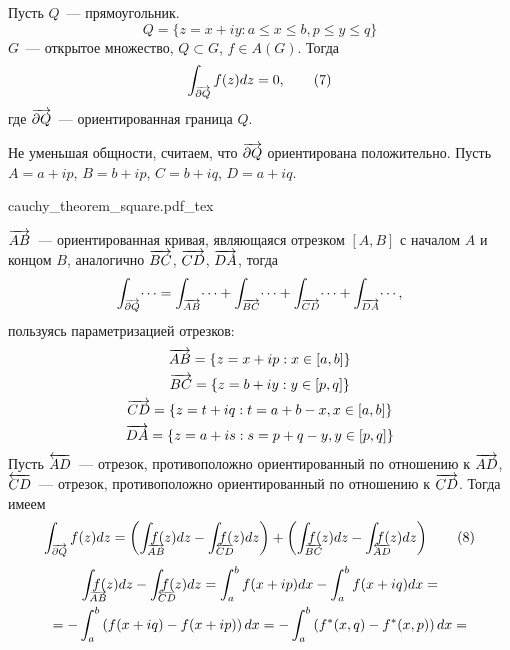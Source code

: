\documentclass[main]{subfiles}
\begin{document}
\begin{theorem}\label{2:cauchy_square}
    Пусть $Q$~--- прямоугольник.
    \[Q = \{z = x + iy: a \le x \le b, p \le y \le q\}\]
    $G$~--- открытое множество, $Q \subset G$, $f \in A(G)$.
    Тогда
    \[\AnClOrInt[\AnClOrCurve[\partial Q]] f(z) dz = 0, \tag{7}\]
    где $\AnClOrCurve[\partial Q]$~--- ориентированная граница $Q$.
\end{theorem}
\begin{longProof}
    Не уменьшая общности, считаем, что $\AnClOrCurve[\partial Q]$ ориентирована положительно.
    Пусть $A = a + ip$, $B = b + ip$, $C = b + iq$, $D = a + iq$.
    \begin{center}
        {cauchy_theorem_square.pdf_tex}
    \end{center}
    $\AnClOrCurve[AB]$~--- ориентированная кривая, являющаяся отрезком $[A, B]$ с началом $A$ и концом $B$, аналогично $\AnClOrCurve[BC]$, $\AnClOrCurve[CD]$, $\AnClOrCurve[DA]$, тогда
    \[\AnClOrInt[\AnClOrCurve[\partial Q]] \dotsi = \AnClOrInt[\AnClOrCurve[AB]] \dotsi + \AnClOrInt[\AnClOrCurve[BC]] \dotsi + \AnClOrInt[\AnClOrCurve[CD]] \dotsi + \AnClOrInt[\AnClOrCurve[DA]] \dotsi,\]
    пользуясь параметризацией отрезков:
    \begin{gather*}
        \AnClOrCurve[AB] = \{z = x + ip: x \in [a,b]\} \\
        \AnClOrCurve[BC] = \{z = b + iy: y \in [p,q]\} \\
        \AnClOrCurve[CD] = \{z = t + iq: t = a + b - x, x \in [a,b]\}\\
        \AnClOrCurve[DA] = \{z = a + is: s = p + q - y, y \in [p,q]\}
    \end{gather*}
    Пусть $\ClOrCurve[AD]$~--- отрезок, противоположно ориентированный по отношению к $\AnClOrCurve[AD]$, $\ClOrCurve[CD]$~--- отрезок, противоположно ориентированный по отношению к $\AnClOrCurve[CD]$.
    Тогда имеем
    \[ \AnClOrInt[\AnClOrCurve[\partial Q]] f(z) dz = \left( \AnClOrInt[\mathrlap{\AnClOrCurve[AB]}] f(z) dz - \ClOrInt[\mathrlap{\ClOrCurve[CD]}] f(z) dz \right) + \left( \AnClOrInt[\mathrlap{\AnClOrCurve[BC]}] f(z) dz - \ClOrInt[\mathrlap{\ClOrCurve[AD]}] f(z) dz \right) \tag{8} \]
    \begin{multline*}
        \AnClOrInt[\mathrlap{\AnClOrCurve[AB]}] f(z) dz - \ClOrInt[\mathrlap{\ClOrCurve[CD]}] f(z) dz = \int_{a}^{b} f(x + ip) dx - \int_{a}^{b} f(x + iq) dx = \\
        = - \int_{a}^{b} \left(f(x + iq) - f(x + ip)\right) dx = - \int_{a}^{b} \left(f^*(x, q) - f^*(x, p)\right) dx = \\

\end{multline*}
\end{longProof}
\end{document}
